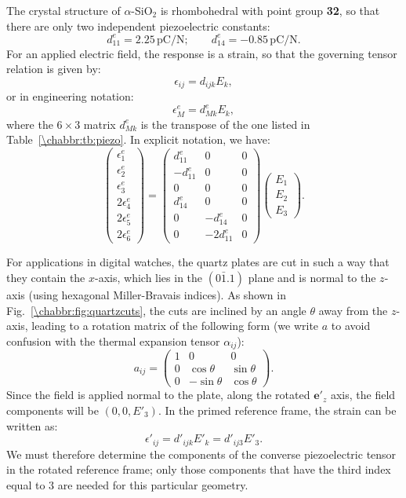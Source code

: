 The crystal structure of $\alpha$-SiO$_2$ is rhombohedral with point group \textbf{32}, so that there are only two independent piezoelectric constants:
\[
	d^{e}_{11}=2.25\,\text{pC/N};\qquad d^{e}_{14}=-0.85\,\text{pC/N}.
\]
For an applied electric field, the response is a strain, so that the governing tensor relation is given by:
\[
	\epsilon_{ij} = d_{ijk}E_k,
\]
or in engineering notation:
\[
	\epsilon^{e}_{M} = d^e_{Mk}E_k,
\]
where the $6\times 3$ matrix $d^e_{Mk}$ is the transpose of the one listed in Table~\ref{\chabbr:tb:piezo}.  In explicit notation, we have:
\[
	\left(\begin{matrix}
	\epsilon^e_1 \\
	\epsilon^e_2 \\
	\epsilon^e_3 \\
	2\epsilon^e_4 \\
	2\epsilon^e_5 \\
	2\epsilon^e_6 \end{matrix}\right) = 
	\left(\begin{matrix}
	d^e_{11} & 0 & 0 \\
	-d^e_{11} & 0 & 0 \\
	0 & 0 & 0 \\
	d^e_{14} & 0 & 0 \\
	0 & -d^e_{14} & 0 \\
	0 & -2d^e_{11} & 0\end{matrix}\right)\left(\begin{matrix} E_1\\ E_2\\ E_3\end{matrix}\right).
\]

For applications in digital watches, the quartz plates are cut in such a way that they contain the $x$-axis, which lies in the $(0\bar{1}.1)$ plane and is normal to the $z$-axis (using hexagonal Miller-Bravais indices). As shown in Fig.~\ref{\chabbr:fig:quartzcuts}, the cuts are inclined by an angle $\theta$ away from the $z$-axis, leading to a rotation matrix of the following  form (we write $a$ to avoid confusion with the thermal expansion tensor $\alpha_{ij}$):
\[
	a_{ij} = \left(\begin{matrix}
	1 & 0 & 0\\
	0 & \cos\theta & \sin\theta\\
	0 & -\sin\theta & \cos\theta\end{matrix}\right).
\]
Since the field is applied normal to the plate, along the rotated $\mathbf{e}'_z$ axis, the field components will be $(0,0,E'_3)$.  In the primed reference frame, the strain can be written as:
\[
	\epsilon'_{ij} = d'_{ijk}E'_k = d'_{ij3}E'_3.
\]
We must therefore determine the components of the converse piezoelectric tensor in the rotated reference frame; only those components that have the third index equal to $3$ are needed for this particular geometry.

